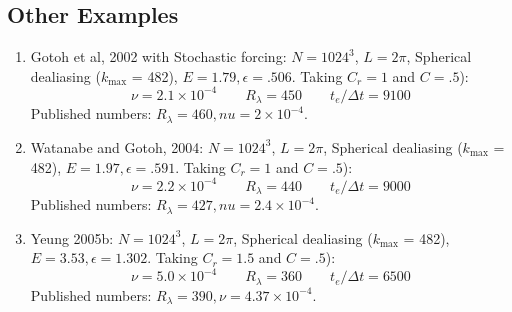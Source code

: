 \documentclass[12pt]{article}
\begin{document}
\subsection{Other Examples}


\begin{enumerate}
\item Gotoh et al, 2002 with Stochastic forcing:  $N=1024^3$, $L=2\pi$, Spherical dealiasing 
($k_\text{max}$ = 482), $E=1.79, \epsilon=.506$.  Taking $C_r=1$ and $C=.5$): 
\[
\nu = 2.1 \times 10^{-4} \qquad  R_\lambda =  450\qquad t_e / \Delta t = 9100
\]
Published numbers:  $R_\lambda=460, nu=2 \times 10^{-4}$.

\item Watanabe and Gotoh, 2004:  $N=1024^3$, $L=2\pi$, Spherical dealiasing 
($k_\text{max}$ = 482), $E=1.97, \epsilon=.591$.  Taking $C_r=1$ and $C=.5$): 
\[
\nu = 2.2 \times 10^{-4} \qquad  R_\lambda =  440\qquad t_e / \Delta t = 9000
\]
Published numbers:  $R_\lambda=427, nu=2.4 \times 10^{-4}$.

\item Yeung 2005b:  $N=1024^3$, $L=2\pi$, Spherical dealiasing 
($k_\text{max}$ = 482), $E=3.53, \epsilon=1.302$.  Taking $C_r=1.5$ and $C=.5$): 
\[
\nu = 5.0 \times 10^{-4} \qquad  R_\lambda =  360\qquad t_e / \Delta t = 6500
\]
Published numbers:  $R_\lambda=390, \nu=4.37 \times 10^{-4}$.




\end{enumerate}
\end{document}
